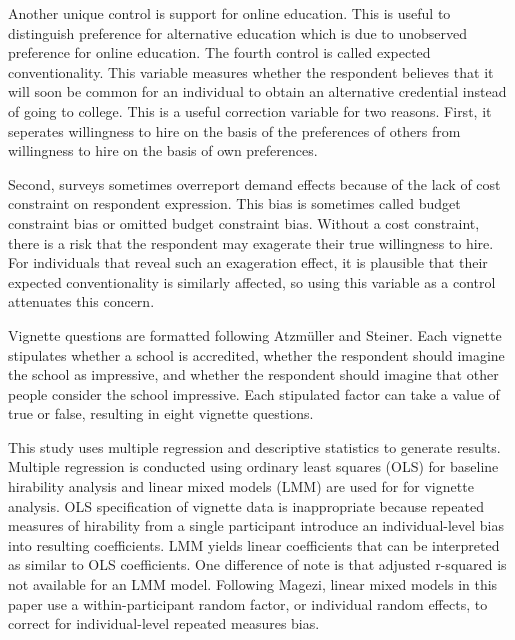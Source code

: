 \documentclass[review]{elsarticle}
\begin{document}
Another unique control is support for online education.
This is useful to distinguish preference for alternative education which is due to unobserved preference for online education.
The fourth control is called expected conventionality.
This variable measures whether the respondent believes
that it will soon be common for an individual to obtain an alternative credential instead of going to college.
This is a useful correction variable for two reasons.
First, it seperates willingness to hire on the basis of the preferences of others from
willingness to hire on the basis of own preferences.

Second, surveys sometimes overreport demand effects because of the lack of cost constraint on respondent expression.
This bias is sometimes called budget constraint bias or omitted budget constraint bias\cite{ahlheim1998contingent, pachali2020omitted}.
Without a cost constraint, there is a risk that the respondent may exagerate their true willingness to hire.
For individuals that reveal such an exageration effect,
it is plausible that their expected conventionality is similarly affected,
so using this variable as a control attenuates this concern.

Vignette questions are formatted following Atzm{\"u}ller and Steiner\cite{atzmuller2010experimental}.
Each vignette stipulates whether a school is accredited,
whether the respondent should imagine the school as impressive,
and whether the respondent should imagine that other people consider the school impressive.
Each stipulated factor can take a value of true or false,
resulting in eight vignette questions.

This study uses multiple regression and descriptive statistics to generate results.
Multiple regression is conducted using ordinary least squares (OLS)
for baseline hirability analysis
and linear mixed models (LMM)
are used for for vignette analysis.
OLS specification of vignette data is inappropriate because repeated measures of hirability
from a single participant introduce an individual-level bias into resulting coefficients.
LMM yields linear coefficients that can be interpreted as similar to OLS coefficients.
One difference of note is that adjusted r-squared is not available for an LMM model.
Following Magezi\cite{magezi2015linear},
linear mixed models in this paper use a within-participant random factor,
or individual random effects,
to correct for individual-level repeated measures bias.
\end{document}

